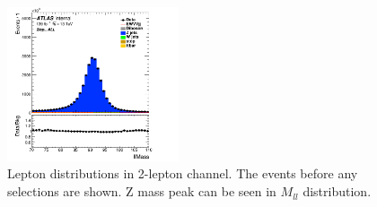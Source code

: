 \begin{figure}[H]
    \centering
    \includegraphics[width=0.45\textwidth]{figures/2lep/dataMC/C_0ptag1pfat0pjet_0ptv_ALL_llMass_Lin}
    \caption{Lepton distributions in 2-lepton channel. The events before any selections are shown. Z mass peak can be seen in $M_{ll}$ distribution.}
    \label{fig:2lepLeptons}
\end{figure}

